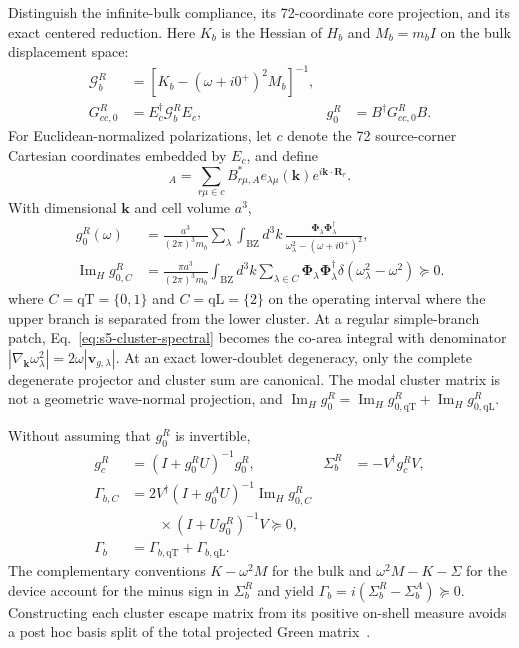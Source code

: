 \documentclass[10pt,aps,pre,reprint,floatfix,notitlepage,nofootinbib]{revtex4-2}
\newcommand{\vk}{\bm{k}}
\newcommand{\vR}{\bm{R}}
\newcommand{\BZ}{\mathrm{BZ}}
\newcommand{\qT}{\mathrm{qT}}
\newcommand{\qL}{\mathrm{qL}}
\newcommand{\ImH}{\operatorname{Im}_{\!H}}
\begin{document}
Distinguish the infinite-bulk compliance, its 72-coordinate core projection, and its exact centered reduction.  Here $K_b$ is the Hessian of $H_b$ and $M_b=m_bI$ on the bulk displacement space:
\begin{align}
 \mathcal G_b^R&=[K_b-(\omega+i0^+)^2M_b]^{-1},\\
 G_{cc,0}^R&=E_c^\dagger\mathcal G_b^RE_c,
 &g_0^R&=B^\dagger G_{cc,0}^RB.
 \label{eq:s5-green-levels}
\end{align}
For Euclidean-normalized polarizations, let $c$ denote the 72 source-corner Cartesian coordinates embedded by $E_c$, and define
\begin{equation}
 [\bm\Phi_\lambda(\vk)]_A
 =\sum_{r\mu\in c}B_{r\mu,A}^*
 e_{\lambda\mu}(\vk)e^{i\vk\cdot\vR_r}.
 \label{eq:s5-form-factor}
\end{equation}
With dimensional $\vk$ and cell volume $a^3$,
\begin{align}
 g_0^R(\omega)
 &=\frac{a^3}{(2\pi)^3m_b}
 \sum_\lambda\int_{\BZ}d^3k\,
 \frac{\bm\Phi_\lambda\bm\Phi_\lambda^\dagger}
 {\omega_\lambda^2-(\omega+i0^+)^2},
 \label{eq:s5-bloch-resolvent}\\
 \ImH g_{0,C}^R
 &=\frac{\pi a^3}{(2\pi)^3m_b}
 \int_{\BZ}d^3k\sum_{\lambda\in C}
 \bm\Phi_\lambda\bm\Phi_\lambda^\dagger
 \delta(\omega_\lambda^2-\omega^2)\succeq0.
 \label{eq:s5-cluster-spectral}
\end{align}
where $C=\qT=\{0,1\}$ and $C=\qL=\{2\}$ on the operating interval where the upper branch is separated from the lower cluster.  At a regular simple-branch patch, Eq.~\eqref{eq:s5-cluster-spectral} becomes the co-area integral with denominator $|\nabla_{\vk}\omega_\lambda^2|=2\omega|\bm v_{g,\lambda}|$.  At an exact lower-doublet degeneracy, only the complete degenerate projector and cluster sum are canonical.  The modal cluster matrix is not a geometric wave-normal projection, and $\ImH g_0^R=\ImH g_{0,\qT}^R+\ImH g_{0,\qL}^R$.

Without assuming that $g_0^R$ is invertible,
\begin{align}
 g_c^R&=(I+g_0^RU)^{-1}g_0^R,
 &\Sigma_b^R&=-V^\dagger g_c^RV,
 \label{eq:s5-dressed-core}\\
 \Gamma_{b,C}
 &=2V^\dagger(I+g_0^AU)^{-1}
 \ImH g_{0,C}^R\\[-2pt]
 &\qquad\times(I+Ug_0^R)^{-1}V\succeq0,
 \label{eq:s5-cluster-linewidth}\\
 \Gamma_b&=\Gamma_{b,\qT}+\Gamma_{b,\qL}.
\end{align}
The complementary conventions $K-\omega^2M$ for the bulk and $\omega^2M-K-\Sigma$ for the device account for the minus sign in $\Sigma_b^R$ and yield $\Gamma_b=i(\Sigma_b^R-\Sigma_b^A)\succeq0$.  Constructing each cluster escape matrix from its positive on-shell measure avoids a post hoc basis split of the total projected Green matrix~\cite{Boumrar2025}.
\end{document}
